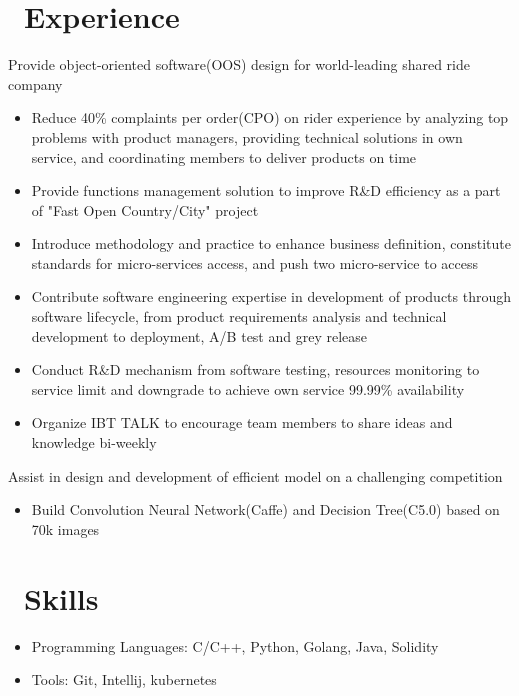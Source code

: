 \documentclass{resume}
\begin{document}
\section{\faUsers\ Experience}
Provide object-oriented software(OOS) design for world-leading shared ride company
\begin{itemize}
  \item Reduce 40\% complaints per order(CPO) on rider experience by analyzing top problems with product managers, providing technical solutions in own service, and coordinating members to deliver products on time
  \item Provide functions management solution to improve R\&D efficiency as a part of "Fast Open Country/City" project
  \item Introduce methodology and practice to enhance business definition, constitute standards for micro-services access, and push two micro-service to access
  \item Contribute software engineering expertise in development of products through software lifecycle, from product requirements analysis and technical development to deployment, A/B test and grey release
  \item Conduct R\&D mechanism from software testing, resources monitoring to service limit and downgrade to achieve own service 99.99\% availability
  \item Organize IBT TALK to encourage team members to share ideas and knowledge bi-weekly
\end{itemize}


Assist in design and development of efficient model on a challenging competition
\begin{itemize}
  \item Build Convolution Neural Network(Caffe) and Decision Tree(C5.0) based on 70k images
\end{itemize}


\section{\faCogs\ Skills}
\begin{itemize}[parsep=0.5ex]
  \item Programming Languages: C/C++, Python, Golang, Java, Solidity
  \item Tools: Git, Intellij, kubernetes
\end{itemize}
\end{document}
